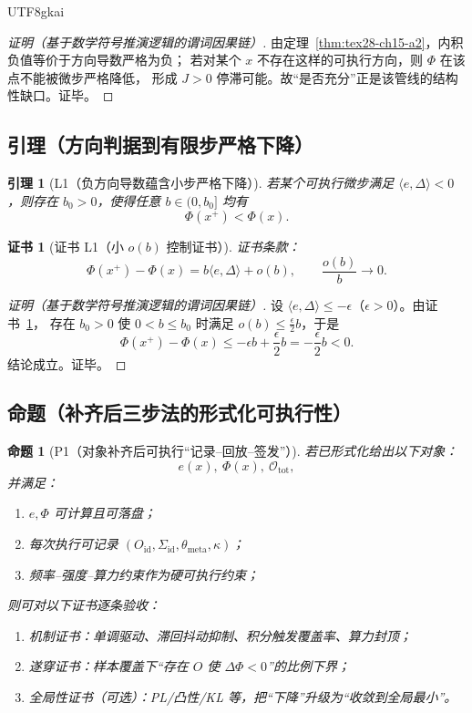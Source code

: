 \documentclass[12pt]{article}
\newtheorem{proposition}{命题}[section]
\newtheorem{lemma}{引理}[section]
\newtheorem{Certificate}{证书}[section]
\begin{document}
\begin{CJK*}{UTF8}{gkai}
\begin{proof}[证明（基于数学符号推演逻辑的谓词因果链）]
由定理~\ref{thm:tex28-ch15-a2}，内积负值等价于方向导数严格为负；
若对某个 $x$ 不存在这样的可执行方向，则 $\Phi$ 在该点不能被微步严格降低，
形成 $J>0$ 停滞可能。故“是否充分”正是该管线的结构性缺口。证毕。
\end{proof}

\subsection{引理（方向判据到有限步严格下降）}
\label{subsec:tex28-ch15-lemmas}

\begin{lemma}[L1（负方向导数蕴含小步严格下降）]
\label{lem:tex28-ch15-l1}
若某个可执行微步满足 $\langle e,\Delta\rangle<0$，则存在 $b_0>0$，使得任意 $b\in(0,b_0]$ 均有
\[
  \Phi(x^+)<\Phi(x).
\]
\end{lemma}

\begin{Certificate}[证书 L1（小 $o(b)$ 控制证书）]
\label{cert:tex28-ch15-l1}
证书条款：
\[
  \Phi(x^+)-\Phi(x)=b\langle e,\Delta\rangle+o(b),\qquad \frac{o(b)}{b}\to 0.
\]
\end{Certificate}

\begin{proof}[证明（基于数学符号推演逻辑的谓词因果链）]
设 $\langle e,\Delta\rangle\le-\epsilon$（$\epsilon>0$）。由证书~\ref{cert:tex28-ch15-l1}，
存在 $b_0>0$ 使 $0<b\le b_0$ 时满足 $o(b)\le \frac{\epsilon}{2}b$，于是
\[
  \Phi(x^+)-\Phi(x)
  \le
  -\epsilon b+\frac{\epsilon}{2}b
  =
  -\frac{\epsilon}{2}b
  <0.
\]
结论成立。证毕。
\end{proof}

\subsection{命题（补齐后三步法的形式化可执行性）}
\label{subsec:tex28-ch15-props}

\begin{proposition}[P1（对象补齐后可执行“记录--回放--签发”）]
\label{prop:tex28-ch15-p1}
若已形式化给出以下对象：
\[
  e(x),\ \Phi(x),\ \mathcal O_{\mathrm{tot}},
\]
并满足：
\begin{enumerate}
  \item $e,\Phi$ 可计算且可落盘；
  \item 每次执行可记录 $(O_{\mathrm{id}},\Sigma_{\mathrm{id}},\theta_{\mathrm{meta}},\kappa)$；
  \item 频率--强度--算力约束作为硬可执行约束；
\end{enumerate}
则可对以下证书逐条验收：
\begin{enumerate}
  \item 机制证书：单调驱动、滞回抖动抑制、积分触发覆盖率、算力封顶；
  \item 遂穿证书：样本覆盖下“存在 $O$ 使 $\Delta\Phi<0$”的比例下界；
  \item 全局性证书（可选）：PL/凸性/KL 等，把“下降”升级为“收敛到全局最小”。
\end{enumerate}
\end{proposition}


\end{CJK*}
\end{document}
